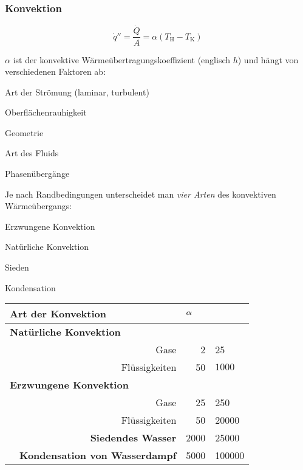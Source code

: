 		\subsubsection{Konvektion} %
			\begin{equation*}
				\dot q'' = \frac{\dot{Q}}{A} = \alpha (T_\text{H} - T_\text{K})
			\end{equation*}

			$\alpha$ ist der konvektive Wärmeübertragungskoeffizient (englisch $h$) und hängt von verschiedenen Faktoren ab:
			\begin{tightitemize}
				\item Art der Strömung (laminar, turbulent)
				\item Oberflächenrauhigkeit
				\item Geometrie
				\item Art des Fluids
				\item Phasenübergänge
			\end{tightitemize}

			Je nach Randbedingungen unterscheidet man \emph{vier Arten} des konvektiven Wärmeübergangs:

			\begin{tightitemize}
				\item Erzwungene Konvektion
				\item Natürliche Konvektion
				\item Sieden
				\item Kondensation
			\end{tightitemize}

			\begin{tabular}{lr|r@{$ - $}l}
				\multicolumn{2}{l}{\textbf{Art der Konvektion}} & \multicolumn{2}{l}{$\boldmath{\alpha}$ \niceunit{\watt\per\metre\squared\per\kelvin}} \\
				\midrule
				\multicolumn{2}{l}{\textbf{Natürliche Konvektion}} & \multicolumn{2}{l}{} \\
				& Gase & 2 & 25 \\
				& Flüssigkeiten & 50 & $1000$ \\
				\midrule
				\multicolumn{2}{l}{\textbf{Erzwungene Konvektion}} & \multicolumn{2}{l}{} \\
				& Gase & 25 & 250 \\
				& Flüssigkeiten & 50 & 20000 \\
				\midrule
				& \textbf{Siedendes Wasser} & 2000 & 25000 \\
				\midrule
				& \textbf{Kondensation von Wasserdampf} & 5000 & 100000 \\
			\end{tabular}

